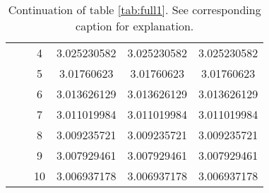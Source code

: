 \begin{table}[h!]
\begin{center}
\begin{tabular}{|c|c|c|c|c|c|}
 &         & 4 &  3.025230582   & 3.025230582    & 3.025230582          \\
 &         & 5 &  3.01760623    & 3.01760623       & 3.01760623        \\
 &         & 6 & 3.013626129    & 3.013626129    & 3.013626129           \\
 &         & 7 &  3.011019984   &  3.011019984     &  3.011019984           \\
 &         & 8 & 3.009235721 & 3.009235721 & 3.009235721           \\
 &         & 9 & 3.007929461  & 3.007929461 & 3.007929461       \\
 &         & 10& 3.006937178   & 3.006937178     & 3.006937178      \\    
 \hline\hline
 \end{tabular}
 
\end{center}
\caption{Continuation of table \ref{tab:full1}. See corresponding caption for explanation.}
\label{tab:full1_2}
\end{table}

\clearpage
